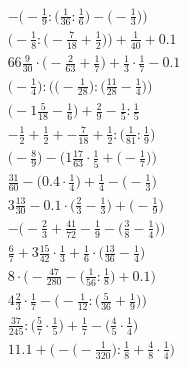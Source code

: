 \documentclass[8pt]{article}
\begin{document}
\begin{align}
-\Big(-\frac{1}{9} : \big(\frac{1}{36} : \frac{1}{6}\big) - \big(-\frac{1}{3}\big)\Big) \\
\Big(-\frac{1}{8} : \big(-\frac{7}{18} + \frac{1}{2}\big)\Big) + \frac{1}{40} + 0.1 \\
66\frac{9}{30} \cdot \big(-\frac{2}{63} + \frac{1}{7}\big) + \frac{1}{3} \cdot \frac{1}{7} - 0.1 \\
\Big(-\frac{1}{4}\Big) : \Big(\big(-\frac{1}{28}\big) : \big(\frac{11}{28} - \frac{1}{4}\big)\Big) \\
\big(-1\frac{5}{18} - \frac{1}{6}\big) + \frac{2}{9} - \frac{1}{5} : \frac{1}{5} \\
-\frac{1}{2} + \frac{1}{2} + -\frac{7}{18} + \frac{1}{2} : \big(\frac{1}{81} : \frac{1}{9}\big) \\
\Big(-\frac{8}{9}\Big) - \Big(1\frac{17}{63} \cdot \frac{1}{5} + \big(-\frac{1}{7}\big)\Big) \\
\frac{31}{60} - \big(0.4 \cdot \frac{1}{4}\big) + \frac{1}{4} - \big(-\frac{1}{3}\big) \\
3\frac{13}{30} - 0.1 \cdot \big(\frac{2}{3} - \frac{1}{3}\big) + \big(-\frac{1}{9}\big) \\
-\Big(-\frac{2}{3} + \frac{41}{72} - \frac{1}{9} - \big(\frac{3}{8} - \frac{1}{4}\big)\Big) \\
\frac{6}{7} + 3\frac{15}{42} \cdot \frac{1}{3} + \frac{1}{6} \cdot \big(\frac{13}{36} - \frac{1}{4}\big) \\
8 \cdot \Big(-\frac{47}{280} - \big(\frac{1}{56} : \frac{1}{8}\big) + 0.1\Big) \\
4\frac{2}{3} \cdot \frac{1}{7} - \Big(-\frac{1}{12} : \big(\frac{5}{36} + \frac{1}{9}\big)\Big) \\
\frac{37}{245} : \big(\frac{5}{7} \cdot \frac{1}{5}\big) + \frac{1}{7} - \big(\frac{4}{5} \cdot \frac{1}{4}\big) \\
11.1 + \Big(-\big(-\frac{1}{320}\big) : \frac{1}{8} + \frac{4}{8} \cdot \frac{1}{4}\Big)
\end{align}
\end{document}
